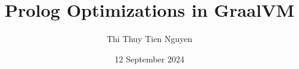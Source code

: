 \documentclass[instructions]{./Packages/uqthesis}
\title{Prolog Optimizations in GraalVM}
\author{Thi Thuy Tien Nguyen}
\date{12 September 2024}
\begin{document}
\frontmatter
\maketitle
\clearpage

\begin{KeepFromToc}
    \setcounter{page}{0} %
    \tableofcontents
\end{KeepFromToc}
\clearpage
\openany

\mainmatter









\end{document}
